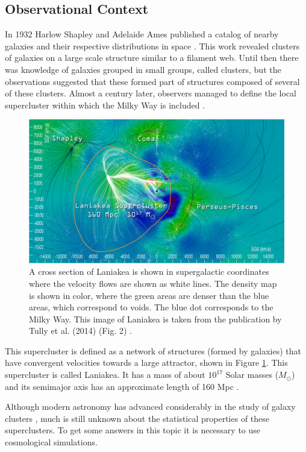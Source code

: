 \subsection{Observational Context}
In 1932 Harlow Shapley and Adelaide Ames published a catalog of nearby galaxies and their respective distributions in space \cite{catalogoRevisado}.  This work revealed clusters of galaxies on a large scale structure similar to a filament web. Until then there was knowledge of galaxies grouped in small groups, called clusters, but the observations suggested that these formed part of structures composed of several of these clusters. Almost a century later, observers managed to define the local supercluster within which the Milky Way is included \cite{tully_laniakea_2014}. 
\begin{figure}[!h]
    \centering
    \includegraphics[width=450pt]{Laniakea.jpg}
    \caption{A cross section of Laniakea is shown in supergalactic coordinates where the velocity flows are shown as white lines. The density map is shown in color, where the green areas are denser than the blue areas, which correspond to voids. The blue dot corresponds to the Milky Way. This image of Laniakea is taken from the publication by Tully et al. (2014)\cite{tully_laniakea_2014} (Fig. 2) .}
    \label{fig:Laniakea}
\end{figure}

This supercluster is defined as a network of structures (formed by galaxies) that have convergent velocities towards a large attractor, shown in Figure \ref{fig:Laniakea}. This supercluster is called Laniakea. It has a mass of about $10^{17}$ Solar masses ($M_{\odot}$) and its semimajor axis has an approximate length of 160 Mpc \cite{NatureTully}.

Although modern astronomy has advanced considerably in the study of galaxy clusters \cite{TheDeepUniverse}, much is still unknown about the statistical properties of these superclusters. To get some answers in this topic it is necessary to use cosmological simulations.

